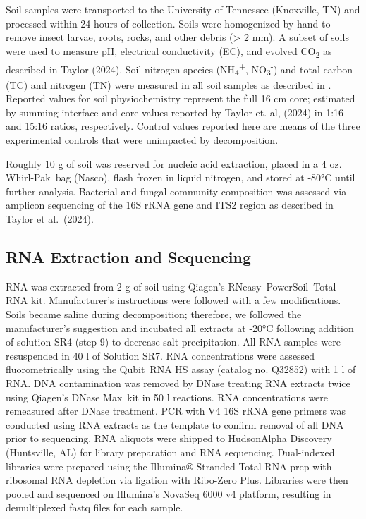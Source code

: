 \documentclass[
  sn-nature,
  lineno, referee]{sn-jnl}
\begin{document}
Soil samples were transported to the University of Tennessee (Knoxville,
TN) and processed within 24 hours of collection. Soils were homogenized
by hand to remove insect larvae, roots, rocks, and other debris
(\textgreater{} 2 mm). A subset of soils were used to measure pH,
electrical conductivity (EC), and evolved CO\textsubscript{2} as
described in Taylor (2024). Soil nitrogen species
(NH\textsubscript{4}\textsuperscript{+},
NO\textsubscript{3}\textsuperscript{-}) and total carbon (TC) and
nitrogen (TN) were measured in all soil samples as described in
\citep{taylor_transient_2024}. Reported values for soil physiochemistry
represent the full 16 cm core; estimated by summing interface and core
values reported by Taylor et. al, (2024) \citep{taylor_transient_2024}
in 1:16 and 15:16 ratios, respectively. Control values reported here are
means of the three experimental controls that were unimpacted by
decomposition.

Roughly 10 g of soil was reserved for nucleic acid extraction, placed in
a 4 oz. Whirl-Pak\texttrademark~bag (Nasco), flash frozen in liquid
nitrogen, and stored at -80°C until further analysis. Bacterial and
fungal community composition was assessed via amplicon sequencing of the
16S rRNA gene and ITS2 region as described in Taylor et al.~(2024).

\subsection{RNA Extraction and
Sequencing}\label{rna-extraction-and-sequencing}

RNA was extracted from 2 g of soil using Qiagen's
RNeasy\textregistered~PowerSoil\textregistered~Total RNA kit.
Manufacturer's instructions were followed with a few modifications.
Soils became saline during decomposition; therefore, we followed the
manufacturer's suggestion and incubated all extracts at -20°C following
addition of solution SR4 (step 9) to decrease salt precipitation. All
RNA samples were resuspended in 40 \textmu l of Solution SR7. RNA
concentrations were assessed fluorometrically using the
Qubit\textregistered~RNA HS assay (catalog no. Q32852) with 1 \textmu l
of RNA. DNA contamination was removed by DNase treating RNA extracts
twice using Qiagen's DNase Max\textregistered~kit in 50 \textmu l
reactions. RNA concentrations were remeasured after DNase treatment. PCR
with V4 16S rRNA gene primers
\citep{apprill_minor_2015, parada_every_2016} was conducted using RNA
extracts as the template to confirm removal of all DNA prior to
sequencing. RNA aliquots were shipped to HudsonAlpha Discovery
(Huntsville, AL) for library preparation and RNA sequencing.
Dual-indexed libraries were prepared using the Illumina® Stranded Total
RNA prep with ribosomal RNA depletion via ligation with Ribo-Zero Plus.
Libraries were then pooled and sequenced on Illumina's NovaSeq 6000 v4
platform, resulting in demultiplexed fastq files for each sample.
\end{document}
